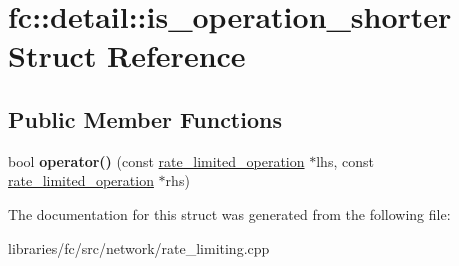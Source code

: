 \hypertarget{structfc_1_1detail_1_1is__operation__shorter}{}\section{fc\+:\+:detail\+:\+:is\+\_\+operation\+\_\+shorter Struct Reference}
\label{structfc_1_1detail_1_1is__operation__shorter}
\subsection*{Public Member Functions}
\begin{DoxyCompactItemize}
\item 
\mbox{\label{structfc_1_1detail_1_1is__operation__shorter_a627302d610ca6e526f14f56462b27aa0}} 
bool {\bfseries operator()} (const \mbox{\hyperlink{classfc_1_1detail_1_1rate__limited__operation}{rate\+\_\+limited\+\_\+operation}} $\ast$lhs, const \mbox{\hyperlink{classfc_1_1detail_1_1rate__limited__operation}{rate\+\_\+limited\+\_\+operation}} $\ast$rhs)
\end{DoxyCompactItemize}


The documentation for this struct was generated from the following file\+:\begin{DoxyCompactItemize}
\item 
libraries/fc/src/network/rate\+\_\+limiting.\+cpp\end{DoxyCompactItemize}

